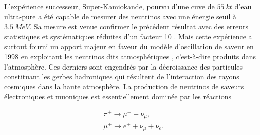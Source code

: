 L'expérience successeur, Super-Kamiokande, pourvu d'une cuve de $\SI{55}{kt}$ d'eau ultra-pure a été capable de mesurer des neutrinos avec une énergie seuil à $\SI{3.5}{MeV}$. Sa mesure est venue confirmer le précédent résultat avec des erreurs statistiques et systématiques réduites d'un facteur 10 \cite{Abe:2016nxk}. Mais cette expérience a surtout fourni un apport majeur en faveur du modèle d'oscillation de saveur en 1998 en exploitant les neutrinos dits \og atmosphériques \fg{}, c'est-à-dire produits dans l'atmosphère. Ces derniers sont engendrés par la décroissance des particules constituant les gerbes hadroniques qui résultent de l'interaction des rayons cosmiques dans la haute atmosphère. La production de neutrinos de saveurs électroniques et muoniques est essentiellement dominée par les réactions

\begin{equation}
    \begin{gathered}
        \pi^+ \rightarrow \mu^+ + \nu_\mu , \\
        \mu^+ \rightarrow e^+ + \overline{\nu}_\mu + \nu_e .
    \end{gathered}
\end{equation}



